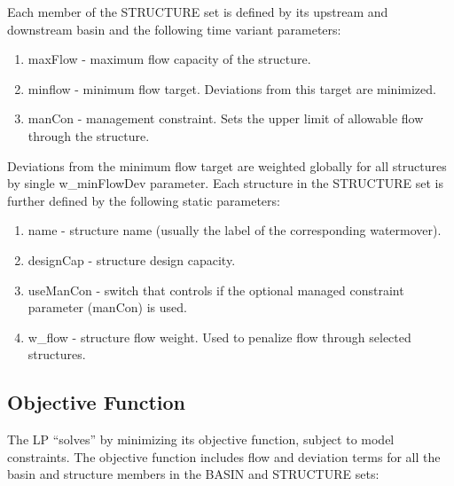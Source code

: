 Each member of the STRUCTURE set is defined by its upstream and
downstream basin and the following time variant parameters:

\begin{enumerate}
 
 \item maxFlow \-- maximum flow capacity of the structure.

 \item minflow \-- minimum flow target.  Deviations from this target
   are minimized.

 \item manCon \-- management constraint.  Sets the upper limit of
   allowable flow through the structure.

\end{enumerate}

Deviations from the minimum flow target are weighted globally for all
structures by single w\_minFlowDev parameter.  Each structure in the
STRUCTURE set is further defined by the following static parameters:
 
\begin{enumerate}
 
 \item name \-- structure name (usually the label of the corresponding watermover).

 \item designCap \-- structure design capacity.

 \item useManCon \-- switch that controls if the optional managed
   constraint parameter (manCon) is used.

 \item w\_flow \-- structure flow weight.  Used to penalize flow
   through selected structures.

\end{enumerate}


\subsection{Objective Function} \label{objectiveFunction}

The LP ``solves'' by minimizing its objective function, subject to
model constraints.  The objective function includes flow and deviation
terms for all the basin and structure members in the BASIN and
STRUCTURE sets:

